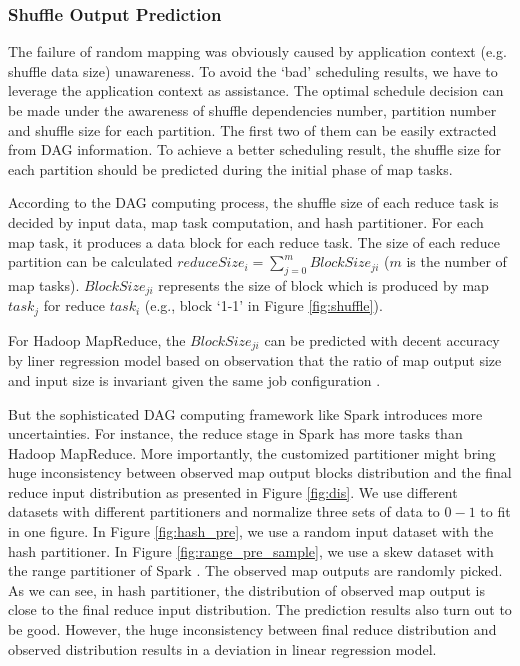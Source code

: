 \subsubsection{Shuffle Output Prediction}\label{shuffleprediction}
The failure of random mapping was obviously caused by application context (e.g. shuffle data size) unawareness. To avoid the `bad' scheduling results, we have to leverage the application context as assistance. The optimal schedule decision can be made under the awareness of shuffle dependencies number, partition number and shuffle size for each partition. The first two of them can be easily extracted from DAG information. To achieve a better scheduling result, the shuffle size for each partition should be predicted during the initial phase of map tasks.

According to the DAG computing process, the shuffle size of each reduce task is decided by input data, map task computation, and hash partitioner. For each map task, it produces a data block for each reduce task. The size of each reduce partition can be calculated $reduceSize_i = \sum_{j=0}^{m} {BlockSize_{ji}}$ ($m$ is the number of map tasks). $BlockSize_{ji}$ represents the size of block which is produced by map $task_j$ for reduce $task_i$ (e.g., block `1-1' in Figure \ref{fig:shuffle}).

For Hadoop MapReduce, the $BlockSize_{ji}$ can be predicted with decent accuracy by liner regression model based on observation that the ratio of map output size and input size is invariant given the same job configuration \cite{ishuffle, predict}.

But the sophisticated DAG computing framework like Spark introduces more uncertainties. For instance, the reduce stage in Spark has more tasks than Hadoop MapReduce. More importantly, the customized partitioner might bring huge inconsistency between observed map output blocks distribution and the final reduce input distribution as presented in Figure \ref{fig:dis}. We use different datasets with different partitioners and normalize three sets of data to $0-1$ to fit in one figure. In Figure \ref{fig:hash_pre}, we use a random input dataset with the hash partitioner. In Figure \ref{fig:range_pre_sample}, we use a skew dataset with the range partitioner of Spark \cite{sparksource}.
The observed map outputs are randomly picked. As we can see, in hash partitioner, the distribution of observed map output is close to the final reduce input distribution. The prediction results also turn out to be good. However, the huge inconsistency between final reduce distribution and observed distribution results in a deviation in linear regression model.

